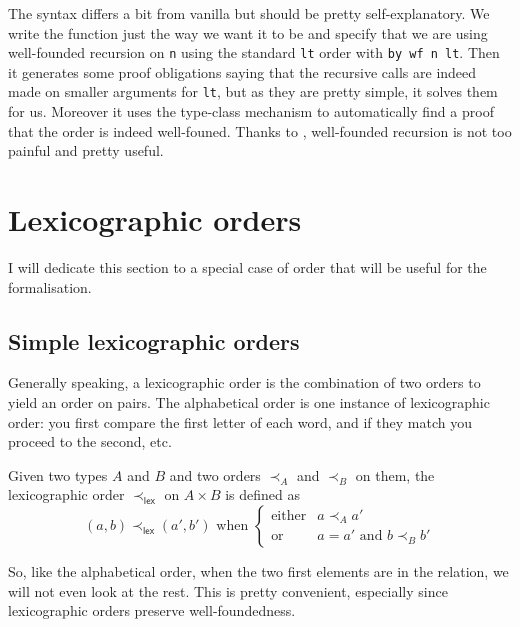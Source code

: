 The syntax differs a bit from vanilla \Coq but should be pretty
self-explanatory. We write the function just the way we want it to be and
specify that we are using well-founded recursion on \texttt{n}
using the standard \texttt{lt} order with \texttt{by wf n lt}.
Then it generates some proof obligations saying that the recursive calls are
indeed made on smaller arguments for \texttt{lt}, but as they are
pretty simple, it solves them for us.
Moreover it uses the type-class mechanism to automatically find a proof that
the order is indeed well-founed.
Thanks to \Equations, well-founded recursion is not too painful and pretty
useful.

\section{Lexicographic orders}

I will dedicate this section to a special case of order that will be useful for
the formalisation.

\subsection{Simple lexicographic orders}

Generally speaking, a lexicographic order is the combination of two orders to
yield an order on pairs. The alphabetical order is one instance of lexicographic
order: you first compare the first letter of each word, and if they match you
proceed to the second, etc.

\begin{definition}
  Given two types \(A\) and \(B\) and two orders \(\prec_A\) and \(\prec_B\)
  on them, the lexicographic order \(\prec_{\mathsf{lex}}\) on \(A \times B\)
  is defined as
  \[
    (a,b) \prec_{\mathsf{lex}} (a',b')
    \text{ when }
    \left\{
    \begin{array}{ll}
      \text{either} & a \prec_A a' \\
      \text{or} & a = a' \text{ and } b \prec_B b'
    \end{array}
    \right.
  \]
\end{definition}

So, like the alphabetical order, when the two first elements are in the
relation, we will not even look at the rest.
This is pretty convenient, especially since lexicographic orders preserve
well-foundedness.

